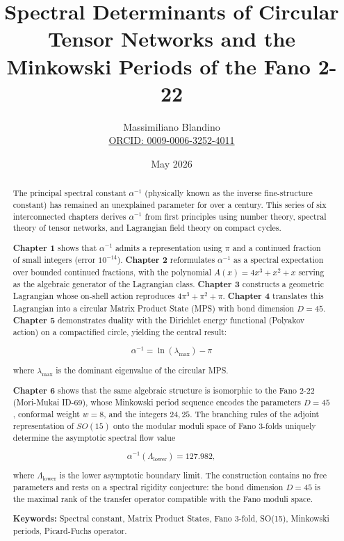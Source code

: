 \documentclass[12pt]{article}
\title{Spectral Determinants of Circular Tensor Networks and the Minkowski Periods of the Fano 2-22}
\author{Massimiliano Blandino \\ 
\href{https://orcid.org/0009-0006-3252-4011}{ORCID: 0009-0006-3252-4011} \\}}
\date{May 2026}
\numberwithin{equation}{section}
\begin{document}
\maketitle

\begin{abstract}
\noindent
The principal spectral constant \(\alpha^{-1}\) (physically known as the inverse fine-structure constant) has remained an unexplained parameter for over a century. This series of six interconnected chapters derives \(\alpha^{-1}\) from first principles using number theory, spectral theory of tensor networks, and Lagrangian field theory on compact cycles.

\textbf{Chapter 1} shows that \(\alpha^{-1}\) admits a representation using \(\pi\) and a continued fraction of small integers (error \(10^{-14}\)). \textbf{Chapter 2} reformulates \(\alpha^{-1}\) as a spectral expectation over bounded continued fractions, with the polynomial \(A(x)=4x^3+x^2+x\) serving as the algebraic generator of the Lagrangian class. \textbf{Chapter 3} constructs a geometric Lagrangian whose on-shell action reproduces \(4\pi^3+\pi^2+\pi\). \textbf{Chapter 4} translates this Lagrangian into a circular Matrix Product State (MPS) with bond dimension \(D=45\). \textbf{Chapter 5} demonstrates duality with the Dirichlet energy functional (Polyakov action) on a compactified circle, yielding the central result:

\[
\alpha^{-1} = \ln(\lambda_{\max}) - \pi
\]

where \(\lambda_{\max}\) is the dominant eigenvalue of the circular MPS. 

\textbf{Chapter 6} shows that the same algebraic structure is isomorphic to the Fano 2-22 (Mori-Mukai ID-69), whose Minkowski period sequence encodes the parameters \(D=45\), conformal weight \(w=8\), and the integers \(24, 25\). The branching rules of the adjoint representation of \(SO(15)\) onto the modular moduli space of Fano 3-folds uniquely determine the asymptotic spectral flow value

\[
\alpha^{-1}(\Lambda_{\text{lower}}) = 127.982,
\]

where \(\Lambda_{\text{lower}}\) is the lower asymptotic boundary limit. The construction contains no free parameters and rests on a spectral rigidity conjecture: the bond dimension \(D=45\) is the maximal rank of the transfer operator compatible with the Fano moduli space.

\noindent\textbf{Keywords:} Spectral constant, Matrix Product States, Fano 3-fold, SO(15), Minkowski periods, Picard-Fuchs operator.
\end{abstract}
\end{document}
